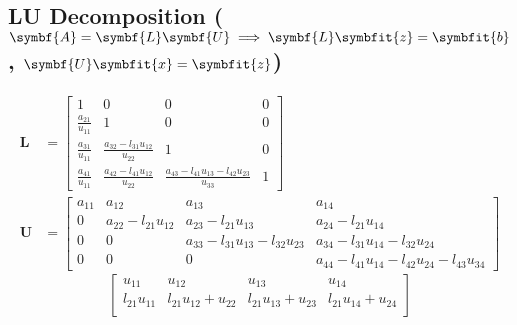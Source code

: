 \documentclass{article}
\begin{document}
\begin{minipage}[t]{126.1962963mm}
    \subsection{LU Decomposition (\texorpdfstring{\(\symbf{A} = \symbf{L} \symbf{U} \implies \symbf{L} \symbfit{z} = \symbfit{b}\), \(\symbf{U} \symbfit{x} = \symbfit{z}\)}{A = LU => L z = b, U x = z})}
    \begin{align*}
        \symbf{L} & = \begin{bmatrix}
                          1                     & 0                                   & 0                                                 & 0 \\
                          \frac{a_{21}}{u_{11}} & 1                                   & 0                                                 & 0 \\
                          \frac{a_{31}}{u_{11}} & \frac{a_{32}-l_{31} u_{12}}{u_{22}} & 1                                                 & 0 \\
                          \frac{a_{41}}{u_{11}} & \frac{a_{42}-l_{41} u_{12}}{u_{22}} & \frac{a_{43}-l_{41} u_{13}-l_{42} u_{23}}{u_{33}} & 1
                      \end{bmatrix} \\
        \symbf{U} & = \begin{bmatrix}
                          a_{11} & a_{12}               & a_{13}                             & a_{14}                                           \\
                          0      & a_{22}-l_{21} u_{12} & a_{23}-l_{21} u_{13}               & a_{24}-l_{21} u_{14}                             \\
                          0      & 0                    & a_{33}-l_{31} u_{13}-l_{32} u_{23} & a_{34}-l_{31} u_{14}-l_{32} u_{24}               \\
                          0      & 0                    & 0                                  & a_{44}-l_{41} u_{14}-l_{42} u_{24}-l_{43} u_{34}
                      \end{bmatrix}
    \end{align*}
    \begin{equation*}
        \begin{bmatrix}
            u_{11}        & u_{12}                      & u_{13}                                    & u_{14}                                           \\
            l_{21} u_{11} & l_{21} u_{12}+u_{22}        & l_{21} u_{13}+u_{23}                      & l_{21} u_{14}+u_{24}                             \\

\end{bmatrix}
\end{equation*}
\end{minipage}
\end{document}
